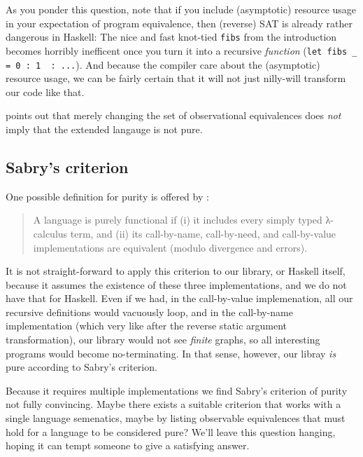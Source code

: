 \documentclass[manuscript,screen,acmsmall]{acmart}
\begin{document}
As you ponder this question, note that if you include (asymptotic) resource usage in your expectation of program equivalence, then (reverse) SAT is already rather dangerous in Haskell: The nice and fast knot-tied \verb|fibs| from the introduction becomes horribly inefficent once you turn it into a recursive \emph{function} (\verb|let fibs _ = 0 : 1  : ...|). And because the compiler care about the (asymptotic) resource usage, we can be fairly certain that it will not just nilly-will transform our code like that.

 points out that merely changing the set of observational equivalences does \emph{not} imply that the extended langauge is not pure.

\subsection{Sabry's criterion}

One possible definition for purity is offered by \citet{sabry}:
\begin{quote}
A language is purely functional if (i) it includes every simply typed λ-calculus term, and
(ii) its call-by-name, call-by-need, and call-by-value implementations are equivalent (modulo
divergence and errors).
\end{quote}

It is not straight-forward to apply this criterion to our library, or Haskell itself, because it assumes the existence of these three implementations, and we do not have that for Haskell. Even if we had, in the call-by-value implemenation, all our recursive definitions would vacuously loop, and in the call-by-name implementation (which very like after the reverse static argument transformation), our library would not see \emph{finite} graphs, so all interesting programs would become no-terminating. In that sense, however, our libray \emph{is} pure according to Sabry’s criterion.

Because it requires multiple implementations we find Sabry’s criterion of purity not fully convincing. Maybe there exists a suitable criterion that works with a single language semenatics, maybe by listing observable equivalences that must hold for a language to be considered pure?
We'll leave this question hanging, hoping it can tempt someone to give a satisfying answer.

% 
\end{document}
